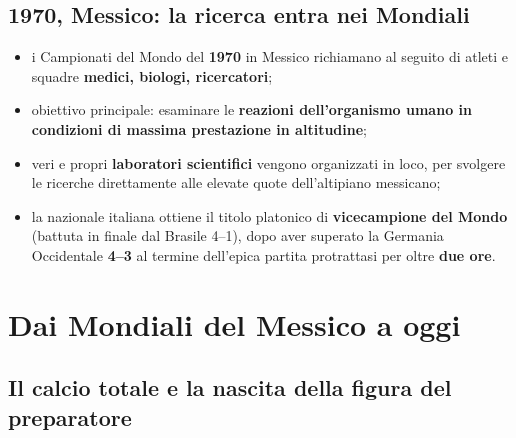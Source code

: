 \subsection{1970, Messico: la ricerca entra nei Mondiali}

\begin{itemize}
  \item i Campionati del Mondo del \textbf{1970} in Messico richiamano al seguito di atleti e
    squadre \textbf{medici, biologi, ricercatori};
  \item obiettivo principale: esaminare le \textbf{reazioni dell'organismo umano in condizioni di
    massima prestazione in altitudine};
  \item veri e propri \textbf{laboratori scientifici} vengono organizzati in loco, per svolgere le
    ricerche direttamente alle elevate quote dell'altipiano messicano;
  \item la nazionale italiana ottiene il titolo platonico di \textbf{vicecampione del Mondo}
    (battuta in finale dal Brasile 4--1), dopo aver superato la Germania Occidentale
    \textbf{4--3} al termine dell'epica partita protrattasi per oltre \textbf{due ore}.
\end{itemize}

\section{Dai Mondiali del Messico a oggi}

\subsection{Il calcio totale e la nascita della figura del preparatore}

